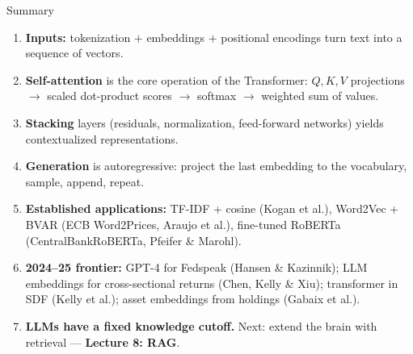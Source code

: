 \documentclass[10pt,english,aspectratio=169]{beamer}
\begin{document}
\begin{frame}{Summary}
\begin{enumerate}
\item \textbf{Inputs:} tokenization $+$ embeddings $+$ positional encodings turn text into a sequence of vectors.
\smallskip
\item \textbf{Self-attention} is the core operation of the Transformer:
$Q,K,V$ projections $\rightarrow$ scaled dot-product scores $\rightarrow$ softmax $\rightarrow$ weighted sum of values.
\smallskip
\item \textbf{Stacking} layers (residuals, normalization, feed-forward networks) yields contextualized representations.
\smallskip
\item \textbf{Generation} is autoregressive: project the last embedding to the vocabulary, sample, append, repeat.
\smallskip
\item \textbf{Established applications:}
TF-IDF + cosine (Kogan et al.),
Word2Vec + BVAR (ECB Word2Prices, Araujo et al.),
fine-tuned RoBERTa (CentralBankRoBERTa, Pfeifer \& Marohl).
\smallskip
\item \textbf{2024--25 frontier:}
GPT-4 for Fedspeak (Hansen \& Kazinnik);
LLM embeddings for cross-sectional returns (Chen, Kelly \& Xiu);
transformer in SDF (Kelly et al.);
asset embeddings from holdings (Gabaix et al.).
\smallskip
\item \textbf{LLMs have a fixed knowledge cutoff.}
Next: extend the brain with retrieval --- \textbf{Lecture 8: RAG}.
\end{enumerate}
\end{frame}
\end{document}
